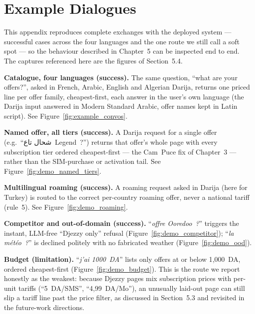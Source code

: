 \documentclass[12pt, a4paper]{report}
\newcommand{\humantext}[1]{#1}      %
\begin{document}
\chapter{Example Dialogues}
\label{app:dialogues}
\humantext{This appendix reproduces complete exchanges with the deployed system --- successful cases across the four languages and the one route we still call a soft spot --- so the behaviour described in Chapter~5 can be inspected end to end. The captures referenced here are the figures of Section~5.4.}

\humantext{\textbf{Catalogue, four languages (success).} The same question, ``what are your offers?'', asked in French, Arabic, English and Algerian Darija, returns one priced line per offer family, cheapest-first, each answer in the user's own language (the Darija input answered in Modern Standard Arabic, offer names kept in Latin script). See Figure~\ref{fig:example_convos}.}

\humantext{\textbf{Named offer, all tiers (success).} A Darija request for a single offer (e.g.\ ``\textarabic{شحال تاع}~Legend~?'') returns that offer's whole page with every subscription tier ordered cheapest-first --- the Cam~Puce fix of Chapter~3 --- rather than the SIM-purchase or activation tail. See Figure~\ref{fig:demo_named_tiers}.}

\humantext{\textbf{Multilingual roaming (success).} A roaming request asked in Darija (here for Turkey) is routed to the correct per-country roaming offer, never a national tariff (rule~5). See Figure~\ref{fig:demo_roaming}.}

\humantext{\textbf{Competitor and out-of-domain (success).} ``\textit{offre Ooredoo~?}'' triggers the instant, LLM-free ``Djezzy only'' refusal (Figure~\ref{fig:demo_competitor}); ``\textit{la météo~?}'' is declined politely with no fabricated weather (Figure~\ref{fig:demo_ood}).}

\humantext{\textbf{Budget (limitation).} ``\textit{j'ai 1000~DA}'' lists only offers at or below 1{,}000~DA, ordered cheapest-first (Figure~\ref{fig:demo_budget}). This is the route we report honestly as the weakest: because Djezzy pages mix subscription prices with per-unit tariffs (``5~DA/SMS'', ``4,99~DA/Mo''), an unusually laid-out page can still slip a tariff line past the price filter, as discussed in Section~5.3 and revisited in the future-work directions.}

\end{document}
